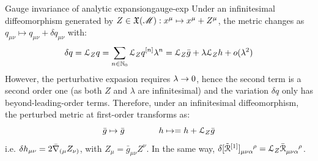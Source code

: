 \begin{observation}{Gauge invariance of analytic expansion}{gauge-exp}
  Under an infinitesimal diffeomorphism generated by $ Z \in \mathfrak{X}(\mathscr{M}) : x^\mu \mapsto x^\mu + Z^\mu $, the metric changes as $ q_{\mu \nu} \mapsto q_{\mu \nu} + \delta q_{\mu \nu} $ with:
  \begin{equation*}
    \delta q = \EuScript{L}_Z q = \sum_{n \in \mathbb{N}_0} \EuScript{L}_Z q^{[n]} \lambda^n = \EuScript{L}_Z \bar{g} + \lambda \EuScript{L}_Z h + o(\lambda^2)
  \end{equation*}
  However, the perturbative expasion requires $ \lambda \rightarrow 0 $, hence the second term is a second order one (as both $ Z $ and $ \lambda $ are infinitesimal) and the variation $ \delta q $ only has beyond-leading-order terms. Therefore, under an infinitesimal diffeomorphism, the perturbed metric at first-order transforms as:
  \begin{equation}
    \bar{g} \mapsto \bar{g}
    \qquad \qquad
    h \mapsto = h + \EuScript{L}_Z \bar{g}
  \end{equation}
  i.e. $ \delta h_{\mu \nu} = 2\bar{\nabla}_{(\mu} Z_{\nu)} $, with $ Z_\mu = \bar{g}_{\mu \nu} Z^\nu $. In the same way, $ \delta \tensor{[\tilde{\rr}\od1]}{_{\mu \nu \alpha}^\rho} = \ld_Z \tensor{\bar{\rr}}{_{\mu \nu \alpha}^\rho} $.
\end{observation}

